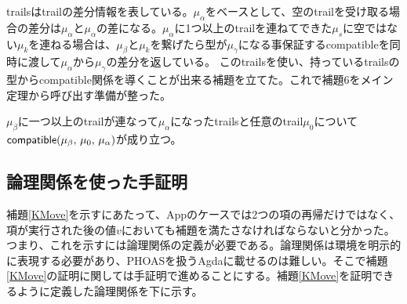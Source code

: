 trailsはtrailの差分情報を表している。$\mu_{\alpha}$をベースとして、空のtrailを受け取る場合の差分は$\mu_{\alpha}$と$\mu_{\alpha}$の差になる。$\mu_{\alpha}$に1つ以上のtrailを連ねてできた$\mu_s$に空ではない$\mu_k$を連ねる場合は、$\mu_{\beta}$と$\mu_k$を繋げたら型が$\mu_{\gamma}$になる事保証する\textsf{compatible}を同時に渡して$\mu_{\alpha}$から$\mu_{\gamma}$の差分を返している。
このtrailsを使い、持っているtrailsの型から\textsf{compatible}関係を導くことが出来る補題を立てた。これで補題6をメイン定理から呼び出す準備が整った。
\begin{lemma}
  $\mu_{\beta}$に一つ以上のtrailが連なって$\mu_{\alpha}$になったtrailsと任意のtrail$\mu_0$について$\textsf{compatible}(\mu_{\beta},\,\mu_0,\,\mu_{\alpha})$が成り立つ。
\end{lemma}


\subsection{論理関係を使った手証明}
補題\ref{KMove}を示すにあたって、Appのケースでは2つの項の再帰だけではなく、項が実行された後の値$v$においても補題を満たさなければならないと分かった。つまり、これを示すには論理関係の定義が必要である。論理関係は環境を明示的に表現する必要があり、PHOASを扱うAgdaに載せるのは難しい。そこで補題\ref{KMove}の証明に関しては手証明で進めることにする。補題\ref{KMove}を証明できるように定義した論理関係を下に示す。

